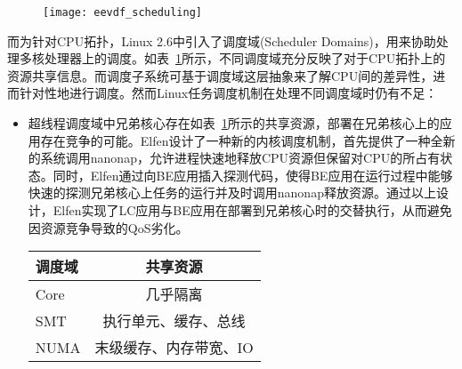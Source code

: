 \begin{figure}[!htbp]
    \centering
    \texttt{[image: eevdf\_scheduling]}
    \label{fig:eevdf_scheduling}
\end{figure}

而为针对CPU拓扑，Linux 2.6中引入了调度域(Scheduler Domains)\citep{schedulerdomains}，用来协助处理多核处理器上的调度。如表~\ref{tab:resourcesharing}所示，不同调度域充分反映了对于CPU拓扑上的资源共享信息。而调度子系统可基于调度域这层抽象来了解CPU间的差异性，进而针对性地进行调度。然而Linux任务调度机制在处理不同调度域时仍有不足：

\begin{itemize}
    \item 超线程调度域中兄弟核心存在如表~\ref{tab:resourcesharing}所示的共享资源，部署在兄弟核心上的应用存在竞争的可能。Elfen\citep{yang2016elfen}设计了一种新的内核调度机制，首先提供了一种全新的系统调用nanonap，允许进程快速地释放CPU资源但保留对CPU的所占有状态。同时，Elfen通过向BE应用插入探测代码，使得BE应用在运行过程中能够快速的探测兄弟核心上任务的运行并及时调用nanonap释放资源。通过以上设计，Elfen实现了LC应用与BE应用在部署到兄弟核心时的交替执行，从而避免因资源竞争导致的QoS劣化。 

    \begin{table}[!htbp]
        \label{tab:resourcesharing}
        \footnotesize%
        \setlength{\tabcolsep}{4pt}%
        \renewcommand{\arraystretch}{1.5}%
        \centering
        \begin{tabular}{lc}
            \hline
            调度域 & 共享资源\\
            \hline
            Core & 几乎隔离\\
            SMT & 执行单元、缓存、总线\\
            NUMA & 末级缓存、内存带宽、IO\\
            \hline
        \end{tabular}
    \end{table}


\end{itemize}

